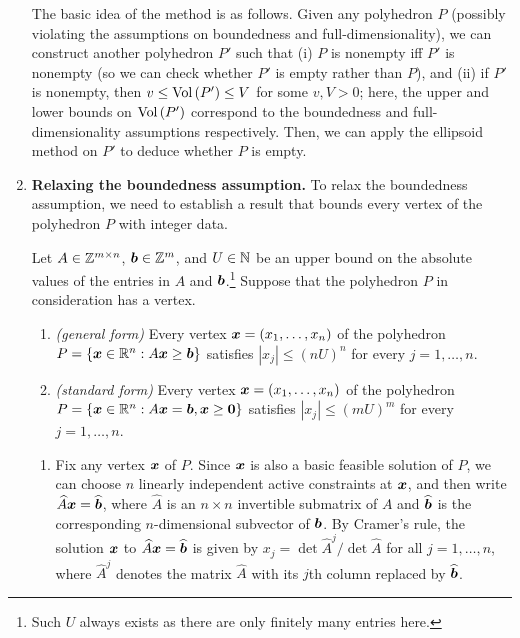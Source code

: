 \begin{enumerate}
The basic idea of the method is as follows. Given any polyhedron \(P\)
(possibly violating the assumptions on boundedness and full-dimensionality), we
can construct another polyhedron \(P'\) such that (i) \(P\) is nonempty iff
\(P'\) is nonempty (so we can check whether \(P'\) is empty rather than \(P\)),
and (ii) if \(P'\) is nonempty, then \(v\le \operatorname{Vol}\left(P'\right)\le V\) for some \(v,V>0\);
here, the upper and lower bounds on \(\operatorname{Vol}\left(P'\right)\) correspond to the boundedness
and full-dimensionality assumptions respectively. Then, we can apply the
ellipsoid method on \(P'\) to deduce whether \(P\) is empty.

\item\label{it:relax-bdd-assum} \textbf{Relaxing the boundedness assumption.}
To relax the boundedness assumption, we need to establish a result that bounds
every vertex of the polyhedron \(P\) with integer data.

\begin{proposition}
\label{prp:polyhedron-vertex-bdd}
Let \(A\in \mathbb{Z}^{m\times n}\), \(\bm{b}\in\mathbb{Z}^{m}\), and \(U\in\mathbb{N}\) be an upper
bound on the absolute values of the entries in \(A\) and
\(\bm{b}\).\footnote{Such \(U\) always exists as there are only finitely many
entries here.} Suppose that the polyhedron \(P\) in consideration has a vertex.
\begin{enumerate}
\item \emph{(general form)} Every vertex \(\bm{x}=(x_1,\dotsc,x_n)\) of the polyhedron
\(P=\{\bm{x}\in\mathbb{R}^n:A\bm{x}\ge\bm{b}\}\) satisfies \(|x_j|\le (nU)^{n}\)
for every \(j=1,\dotsc,n\).
\item \emph{(standard form)} Every vertex \(\bm{x}=(x_1,\dotsc,x_n)\) of the polyhedron
\(P=\{\bm{x}\in\mathbb{R}^n:A\bm{x}=\bm{b}, \bm{x}\ge\bm{0}\}\) satisfies
\(|x_j|\le (mU)^{m}\) for every \(j=1,\dotsc,n\).
\end{enumerate}
\end{proposition}
\begin{pf}
\begin{enumerate}
\item Fix any vertex \(\bm{x}\) of \(P\). Since \(\bm{x}\) is also a basic
feasible solution of \(P\), we can choose \(n\) linearly independent active
constraints at \(\bm{x}\), and then write
\(\widehat{A}\bm{x}=\widehat{\bm{b}}\), where \(\widehat{A}\) is an
\(n\times n\) invertible submatrix of \(A\) and \(\widehat{\bm{b}}\) is the
corresponding \(n\)-dimensional subvector of \(\bm{b}\). By Cramer's rule,
the solution \(\bm{x}\) to \(\widehat{A}\bm{x}=\widehat{\bm{b}}\) is given by
\(x_j=\det\widehat{A}^{j}/\det\widehat{A}\) for all \(j=1,\dotsc,n\), where
\(\widehat{A}^{j}\) denotes the matrix \(\widehat{A}\) with its \(j\)th column
replaced by \(\widehat{\bm{b}}\).


\end{enumerate}
\end{pf}
\end{enumerate}
